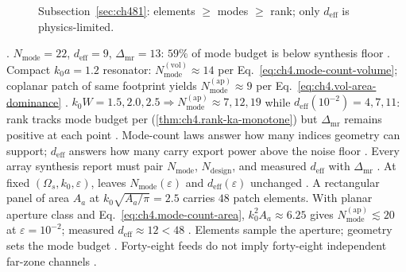\begin{figure}[t]
\centering
{}
\caption{Subsection~\ref{sec:ch481}: elements \(\ge\) modes \(\ge\) rank; only \(d_{\mathrm{eff}}\) is physics-limited.}
\label{fig:ch4.element-mode-rank}
\end{figure}
\cite{collin2001}.
\(N_{\mathrm{mode}}=22\), \(d_{\mathrm{eff}}=9\), \(\Delta_{\mathrm{mr}}=13\): \(59\%\) of mode budget is below synthesis floor \cite{hansen1988}.
Compact \(k_{0}a=1.2\) resonator: \(N_{\mathrm{mode}}^{\mathrm{(vol)}}\approx14\) per Eq.~\eqref{eq:ch4.mode-count-volume}; coplanar patch of same
footprint yields \(N_{\mathrm{mode}}^{\mathrm{(ap)}}\approx9\) per Eq.~\eqref{eq:ch4.vol-area-dominance} \cite{collin2001}.
\(k_{0}W=1.5,2.0,2.5\Rightarrow N_{\mathrm{mode}}^{\mathrm{(ap)}}\approx7,12,19\) while \(d_{\mathrm{eff}}(10^{-2})=4,7,11\): rank tracks mode budget per
(\ref{thm:ch4.rank-ka-monotone}) but \(\Delta_{\mathrm{mr}}\) remains positive at each point \cite{hansen1988}.
Mode-count laws answer how many indices geometry can support; \(d_{\mathrm{eff}}\) answers how many carry export power above the noise floor
\cite{hansen1988}. Every array synthesis report must pair \(N_{\mathrm{mode}}\), \(N_{\mathrm{design}}\), and measured
\(d_{\mathrm{eff}}\) with \(\Delta_{\mathrm{mr}}\) \cite{collin2001}.
\label{cor:ch4.phase-no-mode-gain}
At fixed \((\Omega_{s},k_{0},\varepsilon)\), leaves \(N_{\mathrm{mode}}(\varepsilon)\) and \(d_{\mathrm{eff}}(\varepsilon)\) unchanged
\cite{devaney2004}.
A rectangular panel of area $A_{a}$ at $k_{0}\sqrt{A_{a}/\pi}=2.5$ carries $48$ patch elements. With planar aperture class and Eq.~\eqref{eq:ch4.mode-count-area}, $k_{0}^{2}A_{a}\approx6.25$ gives $N_{\mathrm{mode}}^{\mathrm{(ap)}}\lesssim20$ at $\varepsilon=10^{-2}$; measured $d_{\mathrm{eff}}\approx12<48$ \cite{collin2001}. Elements sample the aperture; geometry sets the mode budget \cite{stratton1941}. Forty-eight feeds do not imply forty-eight independent far-zone channels \cite{harrington2001}.
